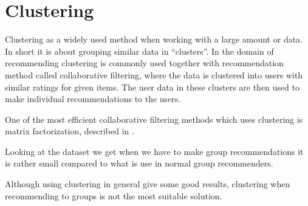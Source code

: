\section{Clustering}\label{bg:clustering}
Clustering as a widely used method when working with a large amount or data. In short it is about grouping similar data in ``clusters''. In the domain of recommending clustering is commonly used together with recommendation method called collaborative filtering, where the data is clustered into users with similar ratings for given items. The user data in these clusters are then used to make individual recommendations to the users.

One of the most efficient collaborative filtering methods which uses clustering is matrix factorization, described in . 

Looking at the dataset we get when we have to make group recommendations it is rather small compared to what is use in normal group recommenders.

Although using clustering in general give some good results, clustering when recommending to groups is not the most suitable solution.





